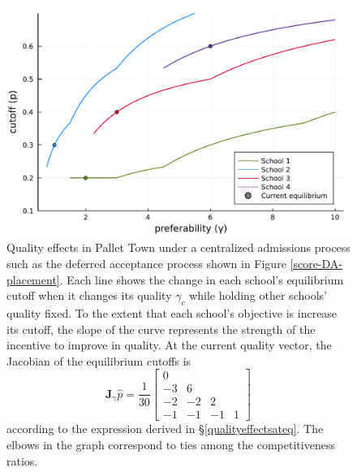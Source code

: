 \documentclass[12pt]{article}
\theoremstyle{definition}
\begin{document}
\begin{figure}
\begin{center}\includegraphics[width=\linewidth, ]{plots/vary-gamma-cutoff.pdf}\end{center}
\captionsetup{singlelinecheck=off}
    \caption[.]{Quality effects in Pallet Town under a centralized admissions process such as the deferred acceptance process shown in Figure \ref{score-DA-placement}. Each line shows the change in each school’s equilibrium cutoff when it changes its quality $\gamma_c$ while holding other schools’ quality fixed. To the extent that each school’s objective is increase its cutoff, the slope of the curve represents the strength of the incentive to improve in quality. At the current quality vector, the Jacobian of the equilibrium cutoffs is
    \begin{equation*}
    \mathbf{J}_\gamma \hat p = \frac{1}{30}
    \begin{bmatrix}
      0 & & & \\
      -3 & 6 & & \\
      -2 & -2 & 2 & \\
      -1 & -1 & -1 & 1 
    \end{bmatrix}
    \end{equation*} 
according to the expression derived in \S\ref{qualityeffectsateq}. The elbows in the graph correspond to ties among the competitiveness ratios. 
    }
\label{vary-gamma-cutoff}
\end{figure}
\end{document}

